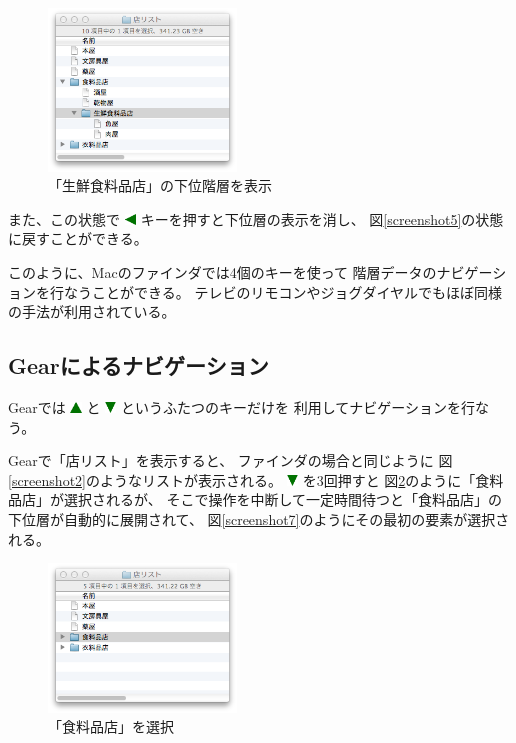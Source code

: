 \documentclass[twoside]{wiss}
\def\GEAR{\textsf{Gear}}
\def\figwidth{50mm}
\def\up{ \includegraphics[width=3mm,bb=0 0 36 36]{figures/uptriangle.pdf} }
\def\down{ \includegraphics[width=3mm,bb=0 0 36 36]{figures/downtriangle.pdf} }
\def\left{ \includegraphics[width=3mm,bb=0 0 36 36]{figures/lefttriangle.pdf} }
\begin{document}
\begin{figure}[H]
\centerline{\includegraphics[width=\figwidth,bb=0 0 344 298]{figures/ce3ee682612de44d6c663a7323c262a6.png}}
\caption{「生鮮食料品店」の下位階層を表示}
\label{screenshot6}
\end{figure}

\noindent
また、この状態で{\left}キーを押すと下位層の表示を消し、
図\ref{screenshot5}の状態に戻すことができる。

このように、Macのファインダでは4個のキーを使って
階層データのナビゲーションを行なうことができる。
テレビのリモコンやジョグダイヤルでもほぼ同様の手法が利用されている。

\subsection{{\GEAR}によるナビゲーション}

{\GEAR}では{\up}と{\down}というふたつのキーだけを
利用してナビゲーションを行なう。

{\GEAR}で「店リスト」を表示すると、
ファインダの場合と同じように
図\ref{screenshot2}のようなリストが表示される。
{\down}を3回押すと
図\ref{screenshot42}のように「食料品店」が選択されるが、
そこで操作を中断して一定時間待つと「食料品店」の下位層が自動的に展開されて、
図\ref{screenshot7}のようにその最初の要素が選択される。

\begin{figure}[H]
\centerline{\includegraphics[width=\figwidth,bb=0 0 344 272]{figures/c074cd6daec3da0341125d1492b8a09c.png}}
\caption{「食料品店」を選択}
\label{screenshot42}
\end{figure}
\end{document}
